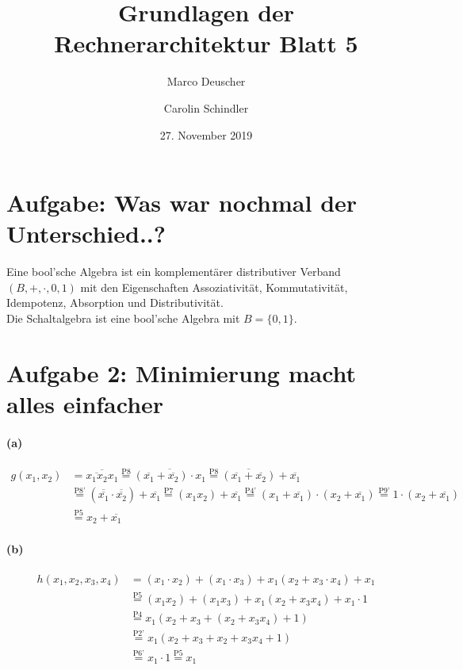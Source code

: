 \documentclass[a4paper]{article}
\title{Grundlagen der Rechnerarchitektur Blatt 5}
\author{Marco Deuscher \and Carolin Schindler}
\date{27. November 2019}
\begin{document}
\maketitle
\section{Aufgabe: Was war nochmal der Unterschied..?}
Eine bool'sche Algebra ist ein komplementärer distributiver Verband $(B,+,\cdot,0,1)$ mit den Eigenschaften Assoziativität, Kommutativität, Idempotenz, Absorption und Distributivität.\\
Die Schaltalgebra ist eine bool'sche Algebra mit $B=\{0,1\}$.
\section{Aufgabe 2: Minimierung macht alles einfacher}
\paragraph{(a)}
\begin{align*}
	g(x_1,x_2)&= \overline{\overline{x_1x_2}x_1} \stackrel{\text{P8}}{=} \overline{(\overline{x_1}+\overline{x_2})\cdot x_1}  \stackrel{\text{P8}}{=}\overline{(\overline{x_1}+\overline{x_2})}+\overline{x_1}\\
			  &\stackrel{\text{P8'}}{=} (\overline{\overline{x_1}}\cdot \overline{\overline{x_2}}) + \overline{x_1} \stackrel{\text{P7}}{=} (x_1x_2)+\overline{x_1} \stackrel{\text{P4'}}{=} (x_1+\overline{x_1})\cdot(x_2+\overline{x_1}) \stackrel{\text{P9'}}{=} 1\cdot (x_2+\overline{x_1})\\
			  &\stackrel{\text{P5}}{=} x_2 + \overline{x_1}
\end{align*}
\paragraph{(b)}
\begin{align*}
	h(x_1,x_2,x_3,x_4) &= (x_1\cdot x_2)+(x_1\cdot x_3)+x_1(x_2+x_3\cdot x_4) + x_1 \\
					   &\stackrel{\text{P5}}{=} (x_1x_2)+(x_1x_3)+x_1(x_2+x_3x_4)+x_1\cdot 1\\
					   &\stackrel{\text{P4}}{=} x_1(x_2+x_3+(x_2+x_3x_4)+1)\\
					   &\stackrel{\text{P2'}}{=} x_1(x_2+x_3+x_2+x_3x_4+1)\\
					   &\stackrel{\text{P6'}}{=} x_1\cdot 1 \stackrel{\text{P5}}{=} x_1
\end{align*}
\end{document}
